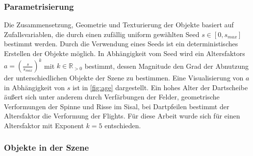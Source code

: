 \subsubsection{Parametrisierung}
\label{sec:met:data:model:param}

Die Zusammensetzung, Geometrie und Texturierung der Objekte basiert auf Zufallsvariablen, die durch einen zufällig uniform gewählten Seed $s \in [0, s_{max}]$ bestimmt werden. Durch die Verwendung eines Seeds ist ein deterministisches Erstellen der Objekte möglich. In Abhängigkeit vom Seed wird ein Altersfaktors $a = \left( \frac{s}{s_{max}} \right)^k$ mit $k \in \mathbb{R}_{>0}$ bestimmt, dessen Magnitude den Grad der Abnutzung der unterschiedlichen Objekte der Szene zu bestimmen. Eine Visualisierung von $a$ in Abhängigkeit von $s$ ist in \autoref{fig:age} dargestellt. Ein hohes Alter der Dartscheibe äußert sich unter anderem durch Verfärbungen der Felder, geometrische Verformungen der Spinne und Risse im Sisal, bei Dartpfeilen bestimmt der Altersfaktor die Verformung der Flights. Für diese Arbeit wurde sich für einen Altersfaktor mit Exponent $k=5$ entschieden.

\begin{center}
    \label{fig:age}
\end{center}

\subsubsection{Objekte in der Szene}
\label{sec:met:data:model:objects}

